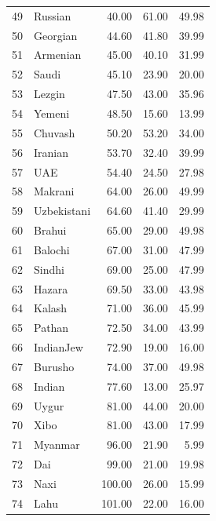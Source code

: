 \documentclass[12pt]{article}
\begin{document}
\begin{table}[ht]
\begin{tabular}{rlrrr}
  49 & \textcolor{Russian}{Russian} & 40.00 & 61.00 & 49.98 \\ 
  50 & \textcolor{Georgian}{Georgian} & 44.60 & 41.80 & 39.99 \\ 
  51 & \textcolor{Armenian}{Armenian} & 45.00 & 40.10 & 31.99 \\ 
  52 & \textcolor{Saudi}{Saudi} & 45.10 & 23.90 & 20.00 \\ 
  53 & \textcolor{Lezgin}{Lezgin} & 47.50 & 43.00 & 35.96 \\ 
  54 & \textcolor{Yemeni}{Yemeni} & 48.50 & 15.60 & 13.99 \\ 
  55 & \textcolor{Chuvash}{Chuvash} & 50.20 & 53.20 & 34.00 \\ 
  56 & \textcolor{Iranian}{Iranian} & 53.70 & 32.40 & 39.99 \\ 
  57 & \textcolor{UAE}{UAE} & 54.40 & 24.50 & 27.98 \\ 
  58 & \textcolor{Makrani}{Makrani} & 64.00 & 26.00 & 49.99 \\ 
  59 & \textcolor{Uzbekistani}{Uzbekistani} & 64.60 & 41.40 & 29.99 \\ 
  60 & \textcolor{Brahui}{Brahui} & 65.00 & 29.00 & 49.98 \\ 
  61 & \textcolor{Balochi}{Balochi} & 67.00 & 31.00 & 47.99 \\ 
  62 & \textcolor{Sindhi}{Sindhi} & 69.00 & 25.00 & 47.99 \\ 
  63 & \textcolor{Hazara}{Hazara} & 69.50 & 33.00 & 43.98 \\ 
  64 & \textcolor{Kalash}{Kalash} & 71.00 & 36.00 & 45.99 \\ 
  65 & \textcolor{Pathan}{Pathan} & 72.50 & 34.00 & 43.99 \\ 
  66 & \textcolor{IndianJew}{IndianJew} & 72.90 & 19.00 & 16.00 \\ 
  67 & \textcolor{Burusho}{Burusho} & 74.00 & 37.00 & 49.98 \\ 
  68 & \textcolor{Indian}{Indian} & 77.60 & 13.00 & 25.97 \\ 
  69 & \textcolor{Uygur}{Uygur} & 81.00 & 44.00 & 20.00 \\ 
  70 & \textcolor{Xibo}{Xibo} & 81.00 & 43.00 & 17.99 \\ 
  71 & \textcolor{Myanmar}{Myanmar} & 96.00 & 21.90 & 5.99 \\ 
  72 & \textcolor{Dai}{Dai} & 99.00 & 21.00 & 19.98 \\ 
  73 & \textcolor{Naxi}{Naxi} & 100.00 & 26.00 & 15.99 \\ 
  74 & \textcolor{Lahu}{Lahu} & 101.00 & 22.00 & 16.00 \\ 

\end{tabular}
\end{table}
\end{document}
